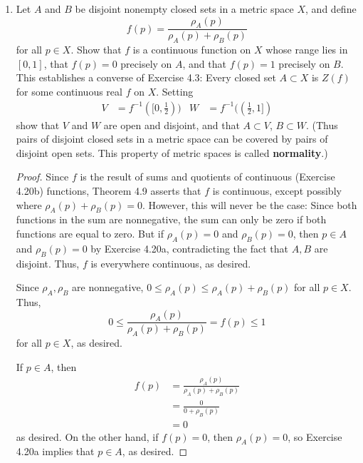 \documentclass[../psets.tex]{subfiles}
\begin{document}
\begin{enumerate}[label={\textbf{\arabic*.}}]
\begin{proof}
    \end{proof}
    \item Let $A$ and $B$ be disjoint nonempty closed sets in a metric space $X$, and define
    \begin{equation*}
        f(p) = \frac{\rho_A(p)}{\rho_A(p)+\rho_B(p)}
    \end{equation*}
    for all $p\in X$. Show that $f$ is a continuous function on $X$ whose range lies in $[0,1]$, that $f(p)=0$ precisely on $A$, and that $f(p)=1$ precisely on $B$. This establishes a converse of Exercise 4.3: Every closed set $A\subset X$ is $Z(f)$ for some continuous real $f$ on $X$. Setting
    \begin{align*}
        V &= f^{-1}([0,\tfrac{1}{2}))&
        W &= f^{-1}((\tfrac{1}{2},1])
    \end{align*}
    show that $V$ and $W$ are open and disjoint, and that $A\subset V$, $B\subset W$. (Thus pairs of disjoint closed sets in a metric space can be covered by pairs of disjoint open sets. This property of metric spaces is called \textbf{normality}.)
    \begin{proof}
        Since $f$ is the result of sums and quotients of continuous (Exercise 4.20b) functions, Theorem 4.9 asserts that $f$ is continuous, except possibly where $\rho_A(p)+\rho_B(p)=0$. However, this will never be the case: Since both functions in the sum are nonnegative, the sum can only be zero if both functions are equal to zero. But if $\rho_A(p)=0$ and $\rho_B(p)=0$, then $p\in A$ and $\rho_B(p)=0$ by Exercise 4.20a, contradicting the fact that $A,B$ are disjoint. Thus, $f$ is everywhere continuous, as desired.\par
        Since $\rho_A,\rho_B$ are nonnegative, $0\leq\rho_A(p)\leq\rho_A(p)+\rho_B(p)$ for all $p\in X$. Thus, 
        \begin{equation*}
            0 \leq \frac{\rho_A(p)}{\rho_A(p)+\rho_B(p)} = f(p) \leq 1
        \end{equation*}
        for all $p\in X$, as desired.\par
        If $p\in A$, then
        \begin{align*}
            f(p) &= \frac{\rho_A(p)}{\rho_A(p)+\rho_B(p)}\\
            &= \frac{0}{0+\rho_B(p)}\tag*{Exercise 4.20a}\\
            &= 0
        \end{align*}
        as desired. On the other hand, if $f(p)=0$, then $\rho_A(p)=0$, so Exercise 4.20a implies that $p\in A$, as desired.\par

\end{proof}
\end{enumerate}
\end{document}
